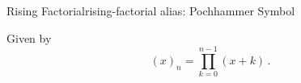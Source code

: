 \begin{definition}{Rising Factorial}{rising-factorial}
  alias: Pochhammer Symbol

  Given by \[(x)_n = \prod_{k=0}^{n-1} (x+k)\,.\]
\end{definition}
